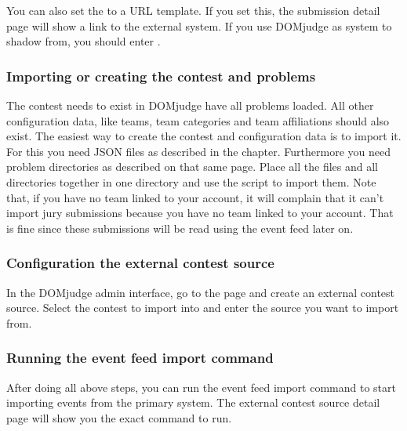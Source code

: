 \documentclass[a4paper,10pt,english,openany]{sphinxmanual}
\begin{document}
\sphinxAtStartPar
You can also set the  to a URL template. If you set
this, the submission detail page will show a link to the external system. If you
use DOMjudge as system to shadow from, you should enter
.


\subsubsection{Importing or creating the contest and problems}
\label{\detokenize{shadow:importing-or-creating-the-contest-and-problems}}
\sphinxAtStartPar
The contest needs to exist in DOMjudge  have all problems loaded. All other
configuration data, like teams, team categories and team affiliations should also
exist. The easiest way to create the contest and configuration data is to import
it. For this you need JSON files as described in the {\hyperref[\detokenize{import::doc}]{}} chapter.
Furthermore you need problem directories as described on that same page. Place
all the files and all directories together in one directory and use the
 script to import them. Note that, if you have no
team linked to your account, it will complain that it can’t import jury
submissions because you have no team linked to your account. That is fine since
these submissions will be read using the event feed later on.


\subsubsection{Configuration the external contest source}
\label{\detokenize{shadow:configuration-the-external-contest-source}}
\sphinxAtStartPar
In the DOMjudge admin interface, go to the  page and
create an external contest source. Select the contest to import into and enter
the source you want to import from.


\subsubsection{Running the event feed import command}
\label{\detokenize{shadow:running-the-event-feed-import-command}}
\sphinxAtStartPar
After doing all above steps, you can run the event feed import command to start
importing events from the primary system. The external contest source detail
page will show you the exact command to run.
\end{document}
